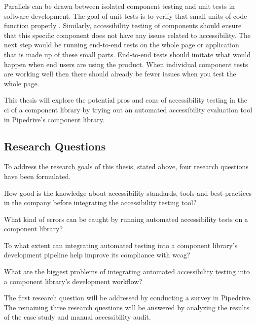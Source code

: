 \documentclass{master_thesis}
\begin{document}
 Parallels can be drawn between isolated component testing and unit tests in software development. The goal of unit tests is to verify that small units of code function properly \citep[p.60]{Humble2010}. Similarly, accessibility testing of components should ensure that this specific component does not have any issues related to accessibility. The next step would be running end-to-end tests on the whole page or application that is made up of these small parts. End-to-end tests should imitate what would happen when end users are using the product. When individual component tests are working well then there should already be fewer issues when you test the whole page.

This thesis will explore the potential pros and cons of accessibility testing in the \ac{ci} of a component library by trying out an automated accessibility evaluation tool in Pipedrive's component library.

\subsection{Research Questions}

To address the research goals of this thesis, stated above, four research questions have been formulated.

	\begin{RQlist}
		\item How good is the knowledge about accessibility standards, tools and best practices in the company before integrating the accessibility testing tool?
		\item What kind of errors can be caught by running automated accessibility tests on a component library?
		\item To what extent can integrating automated testing into a component library's development pipeline help improve its compliance with \ac{wcag}?
		\item What are the biggest problems of integrating automated accessibility testing into a component library's development workflow?
	\end{RQlist}

The first research question will be addressed by conducting a survey in Pipedrive. The remaining three research questions will be answered by analyzing the results of the case study and manual accessibility audit.
\end{document}
